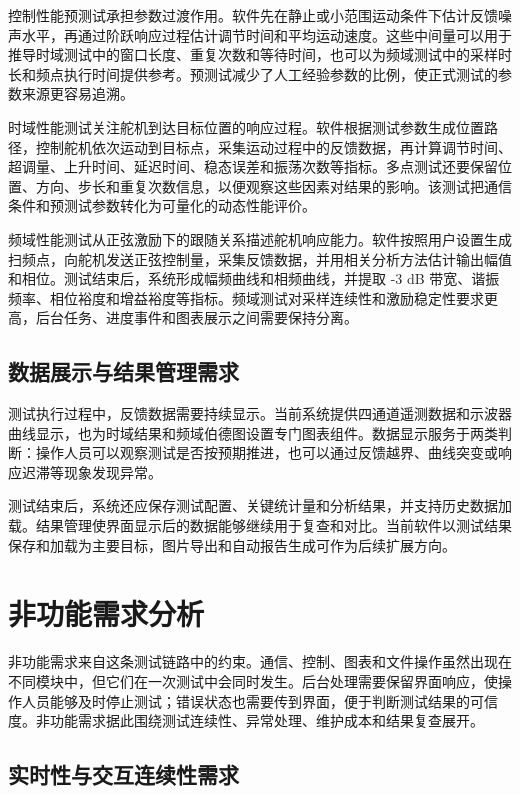 控制性能预测试承担参数过渡作用。软件先在静止或小范围运动条件下估计反馈噪声水平，再通过阶跃响应过程估计调节时间和平均运动速度。这些中间量可以用于推导时域测试中的窗口长度、重复次数和等待时间，也可以为频域测试中的采样时长和频点执行时间提供参考。预测试减少了人工经验参数的比例，使正式测试的参数来源更容易追溯。

时域性能测试关注舵机到达目标位置的响应过程。软件根据测试参数生成位置路径，控制舵机依次运动到目标点，采集运动过程中的反馈数据，再计算调节时间、超调量、上升时间、延迟时间、稳态误差和振荡次数等指标。多点测试还要保留位置、方向、步长和重复次数信息，以便观察这些因素对结果的影响。该测试把通信条件和预测试参数转化为可量化的动态性能评价。

频域性能测试从正弦激励下的跟随关系描述舵机响应能力。软件按照用户设置生成扫频点，向舵机发送正弦控制量，采集反馈数据，并用相关分析方法估计输出幅值和相位。测试结束后，系统形成幅频曲线和相频曲线，并提取 -3 dB 带宽、谐振频率、相位裕度和增益裕度等指标。频域测试对采样连续性和激励稳定性要求更高，后台任务、进度事件和图表展示之间需要保持分离。

\subsection{数据展示与结果管理需求}

测试执行过程中，反馈数据需要持续显示。当前系统提供四通道遥测数据和示波器曲线显示，也为时域结果和频域伯德图设置专门图表组件。数据显示服务于两类判断：操作人员可以观察测试是否按预期推进，也可以通过反馈越界、曲线突变或响应迟滞等现象发现异常。

测试结束后，系统还应保存测试配置、关键统计量和分析结果，并支持历史数据加载。结果管理使界面显示后的数据能够继续用于复查和对比。当前软件以测试结果保存和加载为主要目标，图片导出和自动报告生成可作为后续扩展方向。

\section{非功能需求分析}

非功能需求来自这条测试链路中的约束。通信、控制、图表和文件操作虽然出现在不同模块中，但它们在一次测试中会同时发生。后台处理需要保留界面响应，使操作人员能够及时停止测试；错误状态也需要传到界面，便于判断测试结果的可信度。非功能需求据此围绕测试连续性、异常处理、维护成本和结果复查展开。

\subsection{实时性与交互连续性需求}

